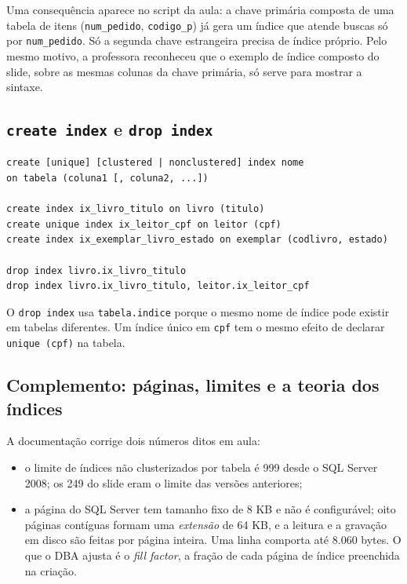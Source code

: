 Uma consequência aparece no script da aula: a chave primária composta
de uma tabela de itens (\texttt{num\_pedido}, \texttt{codigo\_p}) já
gera um índice que atende buscas só por \texttt{num\_pedido}. Só a
segunda chave estrangeira precisa de índice próprio. Pelo mesmo motivo,
a professora reconheceu que o exemplo de índice composto do slide, sobre
as mesmas colunas da chave primária, só serve para mostrar a sintaxe.

\subsection{\texttt{create index} e \texttt{drop index}}

\begin{lstlisting}
create [unique] [clustered | nonclustered] index nome
on tabela (coluna1 [, coluna2, ...])

create index ix_livro_titulo on livro (titulo)
create unique index ix_leitor_cpf on leitor (cpf)
create index ix_exemplar_livro_estado on exemplar (codlivro, estado)

drop index livro.ix_livro_titulo
drop index livro.ix_livro_titulo, leitor.ix_leitor_cpf
\end{lstlisting}

O \texttt{drop index} usa \texttt{tabela.indice} porque o mesmo nome de
índice pode existir em tabelas diferentes. Um índice único em
\texttt{cpf} tem o mesmo efeito de declarar \texttt{unique (cpf)} na
tabela.

\subsection*{Complemento: páginas, limites e a teoria dos índices}

A documentação corrige dois números ditos em aula:

\begin{itemize}
	\item o limite de índices não clusterizados por tabela é 999 desde o
	SQL Server 2008; os 249 do slide eram o limite das versões
	anteriores;
	\item a página do SQL Server tem tamanho fixo de 8 KB e não é
	configurável; oito páginas contíguas formam uma \emph{extensão} de
	64 KB, e a leitura e a gravação em disco são feitas por página
	inteira. Uma linha comporta até 8.060 bytes. O que
	o DBA ajusta é o \emph{fill factor}, a fração de cada página de índice
	preenchida na criação.
\end{itemize}

